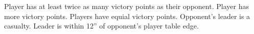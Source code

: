 
\vfill
\scoringbox%
{Player has at least twice as many victory points as their opponent.}%
{Player has more victory points.}%
{Players have equial victory points.}%
{Opponent's leader is a casualty.}%
{Leader is within 12'' of opponent's player table edge.}


